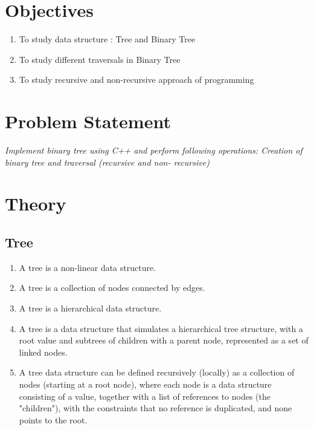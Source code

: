 \documentclass[11pt]{article}
\begin{document}
\tableofcontents
\thispagestyle{empty}
\clearpage

\setcounter{page}{1}

\section{Objectives}
\begin{enumerate}
	\item  To study data structure : Tree and Binary Tree
    \item  To study different traversals in Binary Tree
    \item  To study recursive and non-recursive approach of programming
\end{enumerate}

\section{Problem Statement}
\textit{Implement binary tree using C++ and perform following operations: Creation of binary tree and
traversal (recursive and non- recursive)}
\section{Theory}

\subsection{Tree}
\begin{enumerate}
    \item A tree is a non-linear data structure.
    \item A tree is a collection of nodes connected by edges.
    \item A tree is a hierarchical data structure.
    \item A tree is a data structure that simulates a hierarchical tree structure, with a root value and subtrees of children with a parent node, represented as a set of linked nodes.
    \item A tree data structure can be defined recursively (locally) as a collection of nodes (starting at a root node), where each node is a data structure consisting of a value, together with a list of references to nodes (the "children"), with the constraints that no reference is duplicated, and none points to the root.
    
\end{enumerate}
\end{document}
